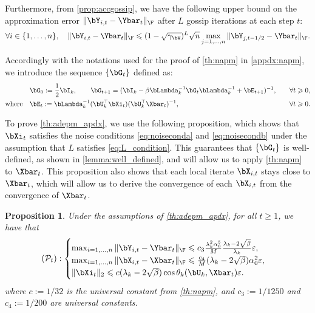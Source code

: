 \documentclass{article}
\theoremstyle{plain}
\newtheorem{proposition}[theorem]{Proposition}
\theoremstyle{definition}
\theoremstyle{remark}
\begin{document}
Furthermore, from \cref{prop:accgossip}, we have the following upper bound on the approximation error $\Vert\bY_{i,t} - \Ybar_t\Vert_\F$ after $L$ gossip iterations at each step $t$:
\begin{align}\label{eq:yibar_bound}
  \forall i \in \{1, \dots, n\}, \quad \Vert \bY_{i,t} - \Ybar_t \Vert_\F \leqslant (1-\sqrt{\gamma_\bW})^L \sqrt{n} \max_{j=1,\dots,n} \Vert \bY_{j,t-1/2} - \Ybar_{t} \Vert_\F.
\end{align}


Accordingly with the notations used for the proof of \cref{th:napm} in \cref{appdx:napm}, we introduce the sequence $\{\bG_t\}$ defined as:
\begin{align*}
  & \bG_0 := \frac{1}{2}\bI_k, \qquad \bG_{t+1} = (\bI_k - \beta \bLambda_k^{-1} \bG_t \bLambda_k^{-1} + \bE_{t+1})^{-1}, \quad && \forall t \geqslant 0,\\
  \text{where} \quad & \bE_{t} := \bLambda_k^{-1} (\bU_k^\top\bXi_t) (\bU_k^\top \Xbar_t)^{-1}, \quad && \forall t \geqslant 0.
\end{align*}

To prove \cref{th:adepm_apdx}, we use the following proposition, which shows that $\bXi_t$ satisfies the noise conditions \eqref{eq:noiseconda} and \eqref{eq:noisecondb} under the assumption that $L$ satisfies \eqref{eq:L_condition}. This guarantees that $\{\bG_t\}$ is well-defined, as shown in \cref{lemma:well_defined}, and will allow us to apply \cref{th:napm} to $\Xbar_t$. This proposition also shows that each local iterate $\bX_{i,t}$ stays close to $\Xbar_t$, which will allow us to derive the convergence of each $\bX_{i,t}$ from the convergence of $\Xbar_t$.

\begin{proposition}\label{lemma:adepm_lemma}
  Under the assumptions of \cref{th:adepm_apdx}, for all $t \geqslant 1$, we have that
    \begin{align*}
    (\mathcal{P}_t): \begin{cases}
      \max_{i=1, \dots, n} \Vert \bY_{i,t} - \Ybar_t \Vert_\F \leqslant c_3\frac{\lambda_k^2 \alpha_0^5}{M} \frac{\lambda_k-2\sqrt{\beta}}{\lambda_k}\varepsilon, \\
      \max_{i=1,\dots,n}\Vert\bX_{i,t} - \Xbar_t\Vert_\F \leqslant \frac{c_4}{M} (\lambda_k-2\sqrt{\beta})\alpha_0^2\varepsilon,\\ 
      \Vert\bXi_t\Vert_2 \leqslant c (\lambda_k - 2\sqrt{\beta}) \cos \theta_k(\bU_k, \Xbar_t)\varepsilon.
    \end{cases}
  \end{align*}
  where $c := 1/32$ is the universal constant from \cref{th:napm}, and $c_3 := 1/1250$ and $c_4 := 1/200$ are universal constants.
\end{proposition}
\end{document}
